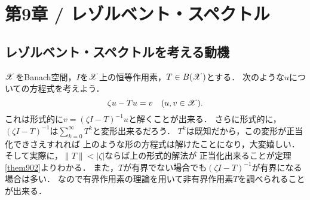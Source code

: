 \section{第9章 / レゾルベント・スペクトル}
    \subsection{レゾルベント・スペクトルを考える動機}
        $\mathscr{X}$をBanach空間，$I$を$\mathscr{X}$上の恒等作用素，$T \in B(\mathscr{X})$とする．
        次のような$u$についての方程式を考えよう．
        \[ \zeta u-Tu=v ~~~(u,v \in \mathscr{X}). \label{eq905}\]
        これは形式的に$v=(\zeta I-T)^{-1} u$と解くことが出来る．
        さらに形式的に，$(\zeta I-T)^{-1}$は$\sum_{k=0}^{\infty}T^k$と変形出来るだろう．
        $T^k$は既知だから，この変形が正当化できさえすれれば
        上のような形の方程式は解けたことになり，大変嬉しい．
        そして実際に，$\|T\|<|\zeta|$ならば上の形式的解法が
        正当化出来ることが定理\ref{them902}よりわかる．
        また，$T$が有界でない場合でも$(\zeta I-T)^{-1}$が有界になる場合は多い．
        なので有界作用素の理論を用いて非有界作用素$T$を調べられることが出来る．

